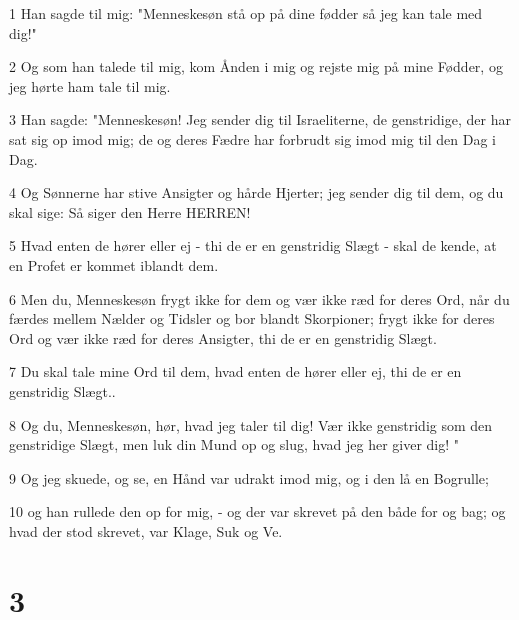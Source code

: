 \par 1 Han sagde til mig: "Menneskesøn stå op på dine fødder så jeg kan tale med dig!"
\par 2 Og som han talede til mig, kom Ånden i mig og rejste mig på mine Fødder, og jeg hørte ham tale til mig.
\par 3 Han sagde: "Menneskesøn! Jeg sender dig til Israeliterne, de genstridige, der har sat sig op imod mig; de og deres Fædre har forbrudt sig imod mig til den Dag i Dag.
\par 4 Og Sønnerne har stive Ansigter og hårde Hjerter; jeg sender dig til dem, og du skal sige: Så siger den Herre HERREN!
\par 5 Hvad enten de hører eller ej - thi de er en genstridig Slægt - skal de kende, at en Profet er kommet iblandt dem.
\par 6 Men du, Menneskesøn frygt ikke for dem og vær ikke ræd for deres Ord, når du færdes mellem Nælder og Tidsler og bor blandt Skorpioner; frygt ikke for deres Ord og vær ikke ræd for deres Ansigter, thi de er en genstridig Slægt.
\par 7 Du skal tale mine Ord til dem, hvad enten de hører eller ej, thi de er en genstridig Slægt..
\par 8 Og du, Menneskesøn, hør, hvad jeg taler til dig! Vær ikke genstridig som den genstridige Slægt, men luk din Mund op og slug, hvad jeg her giver dig! "
\par 9 Og jeg skuede, og se, en Hånd var udrakt imod mig, og i den lå en Bogrulle;
\par 10 og han rullede den op for mig, - og der var skrevet på den både for og bag; og hvad der stod skrevet, var Klage, Suk og Ve.

\chapter{3}

